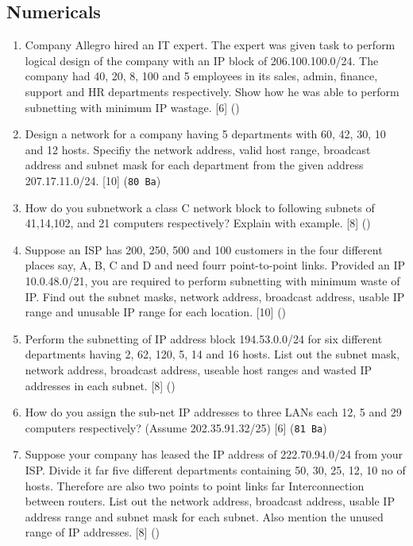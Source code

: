 \documentclass[12pt]{article}
\begin{document}
	\subsection{Numericals}
		\begin{enumerate}
			\item Company Allegro hired an IT expert. The expert was given task to perform logical design of the company with an IP block of 206.100.100.0/24. The company had 40, 20, 8, 100 and 5 employees in its sales, admin, finance, support and HR departments respectively. Show how he was able to perform subnetting with minimum IP wastage. \hfill [6] ()

			\item Design a network for a company having 5 departments with 60, 42, 30, 10 and 12 hosts. Specifiy the network address, valid host range, broadcast address and subnet mask for each department from the given address 207.17.11.0/24. \hfill [10] (\texttt{80 Ba})
			
			\item How do you subnetwork a class C network block to following subnets of 41,14,102, and 21 computers respectively? Explain with example. \hfill [8] ()

			\item Suppose an ISP has 200, 250, 500 and 100 customers in the four different places say, A, B, C and D and need fourr point-to-point links. Provided an IP 10.0.48.0/21, you are required to perform subnetting with minimum waste of IP. Find out the subnet masks, network address, broadcast address, usable IP range and unusable IP range for each location. \hfill [10] ()

			\item Perform the subnetting of IP address block 194.53.0.0/24 for six different departments having 2, 62, 120, 5, 14 and 16 hosts. List out the subnet mask, network address, broadcast address, useable host ranges and wasted IP addresses in each subnet. \hfill [8] ()

			\item How do you assign the sub-net IP addresses to three LANs each 12, 5 and 29 computers respectively? (Assume 202.35.91.32/25) \hspace{9cm} [6] (\texttt{81 Ba})

			\item Suppose your company has leased the IP address of 222.70.94.0/24 from your ISP. Divide it far five different departments containing 50, 30, 25, 12, 10 no of hosts. Therefore are also two points to point links far Interconnection between routers. List out the network address, broadcast address, usable IP address range and subnet mask for each subnet. Also mention the unused range of IP addresses. \hfill [8] ()


\end{enumerate}
\end{document}
